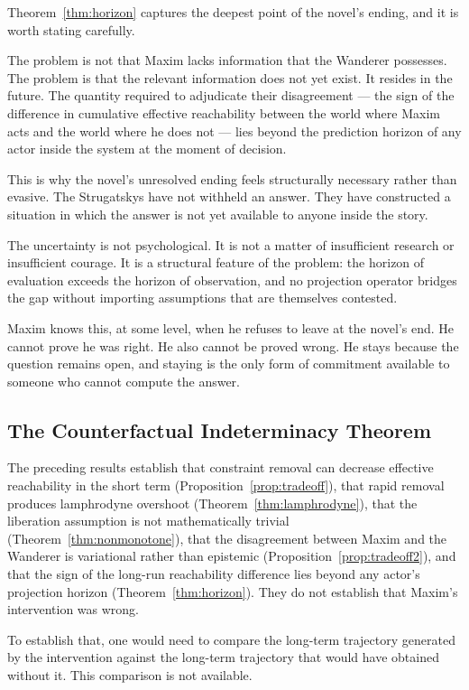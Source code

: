 \documentclass[12pt, a4paper]{article}
\theoremstyle{plain}
\theoremstyle{definition}
\theoremstyle{remark}
\begin{document}
Theorem~\ref{thm:horizon} captures the deepest
point of the novel's ending, and it is worth
stating carefully.

The problem is not that Maxim lacks information
that the Wanderer possesses. The problem is
that the relevant information does not yet
exist. It resides in the future. The quantity
required to adjudicate their disagreement ---
the sign of the difference in cumulative
effective reachability between the world where
Maxim acts and the world where he does not ---
lies beyond the prediction horizon of any
actor inside the system at the moment of
decision.

This is why the novel's unresolved ending
feels structurally necessary rather than
evasive. The Strugatskys have not withheld
an answer. They have constructed a situation
in which the answer is not yet available to
anyone inside the story.

The uncertainty is not psychological.
It is not a matter of insufficient research
or insufficient courage.
It is a structural feature of the problem:
the horizon of evaluation exceeds the horizon
of observation, and no projection operator
bridges the gap without importing assumptions
that are themselves contested.

Maxim knows this, at some level, when he
refuses to leave at the novel's end. He
cannot prove he was right. He also cannot
be proved wrong. He stays because the
question remains open, and staying is the
only form of commitment available to someone
who cannot compute the answer.

\subsection{The Counterfactual Indeterminacy Theorem}

The preceding results establish that constraint
removal can decrease effective reachability in
the short term (Proposition~\ref{prop:tradeoff}),
that rapid removal produces lamphrodyne overshoot
(Theorem~\ref{thm:lamphrodyne}), that the
liberation assumption is not mathematically
trivial (Theorem~\ref{thm:nonmonotone}), that
the disagreement between Maxim and the Wanderer
is variational rather than epistemic
(Proposition~\ref{prop:tradeoff2}), and that
the sign of the long-run reachability difference
lies beyond any actor's projection horizon
(Theorem~\ref{thm:horizon}). They do not
establish that Maxim's intervention was wrong.

To establish that, one would need to compare the
long-term trajectory generated by the intervention
against the long-term trajectory that would have
obtained without it. This comparison is not available.
\end{document}
